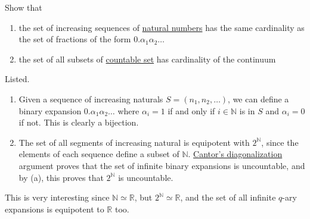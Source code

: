   \begin{exercise}[Zorich 2.4.4]
    Show that
    \begin{enumerate}
      \item the set of increasing sequences of \hyperref[st-def:naturals]{natural numbers} has the same cardinality as the set of fractions of the form $0.\alpha_1 \alpha_2 \ldots$ 
      \item the set of all subsets of \hyperref[st-def:countable]{countable set} has cardinality of the continuum
    \end{enumerate}
  \end{exercise}
  \begin{solution}
    Listed. 
    \begin{enumerate}
      \item Given a sequence of increasing naturals $S = (n_1, n_2, \ldots)$, we can define a binary expansion $0.\alpha_1 \alpha_2 \ldots$ where $\alpha_i = 1$ if and only if $i \in \mathbb{N}$ is in $S$ and $\alpha_i = 0$ if not. This is clearly a bijection. 
      \item The set of all segments of increasing natural is equipotent with $2^\mathbb{N}$, since the elements of each sequence define a subset of $\mathbb{N}$. \hyperref[thm:cantors-diagonalization]{Cantor's diagonalization} argument proves that the set of infinite binary expansions is uncountable, and by (a), this proves that $2^\mathbb{N}$ is uncountable. 
    \end{enumerate}
    This is very interesting since $\mathbb{N} \simeq \mathbb{R}$, but $2^{\mathbb{N}} \simeq \mathbb{R}$, and the set of all infinite $q$-ary expansions is equipotent to $\mathbb{R}$ too. 
  \end{solution}

